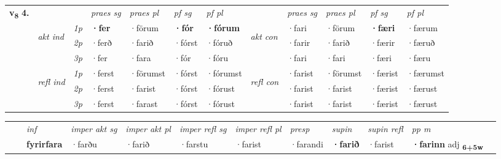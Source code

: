 \begin{tabular}{llllllllllll} \toprule
\multirow{4}{*}{{{\textbf{v{\textsubscript{8}}} \Large{\textbf{4.}}}}}  & &   &  \textit{praes sg}  & \textit{praes pl}  &\textit{ pf sg} & \textit{pf pl} &  &  \textit{praes sg}  & \textit{praes pl}  & \textit{pf sg} & \textit{pf pl } \\*
	\cmidrule{4-7} \cmidrule{9-12}
 & \multirow{3}{*}{\begin{turn}{90}\textit{akt ind}\end{turn}} & {\textit{1p}} & \textbf{·fer} & ·förum    & \textbf{·fór} & \textbf{·fórum} & \multirow{3}{*}{\begin{turn}{90}\textit{akt con}\end{turn}} &·fari & ·förum & \textbf{·færi} & ·færum\\*
& &  {\textit{2p}} &  ·ferð  & ·farið   & ·fórst & ·fóruð & & ·farir & ·farið & ·færir & ·færuð \\*
& &  {\textit{3p}} & ·fer & ·fara   & ·fór & ·fóru & & ·fari & ·fari& ·færi & ·færu  \\*
\cmidrule{4-7} \cmidrule{9-12}
 &\multirow{3}{*}{\begin{turn}{90}\textit{refl ind}\end{turn}} & {\textit{1p}} & ·ferst & ·förumst    & ·fórst & ·fórumst & \multirow{3}{*}{\begin{turn}{90}\textit{refl con}\end{turn}}  &·farist & ·förumst & ·færist & ·færumst\\*
 &&  {\textit{2p}} &  ·ferst  & ·farist   & ·fórst & ·fórust & &·farist & ·farist & ·færist & ·færust \\*
& &  {\textit{3p}} & ·ferst & ·farast   & ·fórst & ·fórust & & ·farist & ·farist& ·færist & ·færust  \\*
\cmidrule{4-7} \cmidrule{9-12}
\end{tabular}


\begin{tabular}{llllllllllll}
 & & \textit{inf} & \textit{imper akt sg} & \textit{imper akt pl} & \textit{imper refl sg} & \textit{imper refl pl} & \textit{presp} & \textit{supin} & \textit{supin refl} & \textit{pp m}     \\*
  & & \textbf{fyrirfara} & ·farðu  & ·farið & ·farstu & ·farist & ·farandi &  \textbf{·farið} & ·farist & \textbf{·farinn} adj \textbf{\textsubscript{6+5w}} \\*
\cmidrule{1-12}
\end{tabular}



